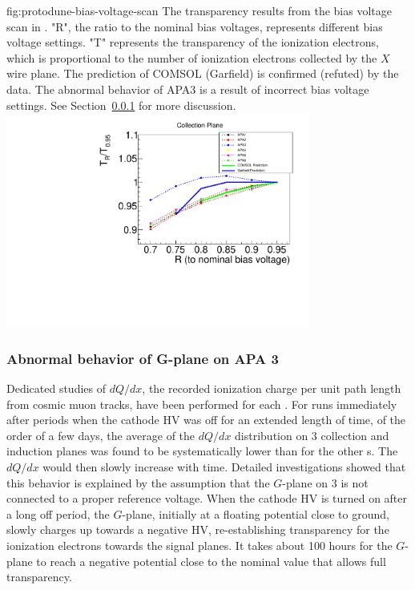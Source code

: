 \begin{dunefigure}{fig:protodune-bias-voltage-scan}
{The transparency results from the bias voltage scan in . "R", the ratio to the nominal bias voltages, represents different bias voltage settings. "T" represents the transparency of the ionization electrons, which is proportional to the number of ionization electrons collected by the $X$ wire plane. The prediction of COMSOL (Garfield) is confirmed (refuted) by the  data. The abnormal behavior of APA3 is a result of incorrect bias voltage settings. See Section~\ref{sec:fdsp-apa-qa-g-plane} for more discussion.}
\includegraphics[width=0.75\textwidth]{graphics/protodune-bias_voltage_scan_group1.pdf}   
\end{dunefigure}

\subsubsection{Abnormal behavior of G-plane on APA 3}
\label{sec:fdsp-apa-qa-g-plane}

Dedicated studies of $dQ/dx$, the recorded ionization charge per unit path length from cosmic muon tracks, have been performed for each . For runs immediately after periods when the cathode HV was off for an extended length of time, of the order of a few days, the average of the $dQ/dx$ distribution on  3 collection and induction planes was found to be systematically lower than for the other s.  The $dQ/dx$ would then slowly increase with time.  Detailed investigations showed that this behavior is explained by the assumption that the $G$-plane on  3 is not connected to a proper reference voltage. When the cathode HV is turned on after a long off period, the $G$-plane, initially at a floating potential close to ground, slowly charges up towards a negative HV,  re-establishing transparency for the ionization electrons towards the signal planes. It takes about 100 hours for the $G$-plane to reach a negative potential close to the nominal value that allows full transparency.

